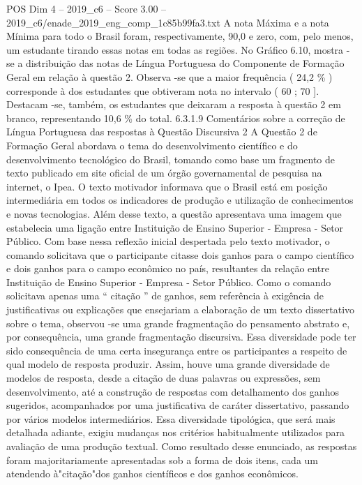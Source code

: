 \begin{textsample}{POS Dim 4 – 2019\_c6 – Score 3.00 – 2019\_c6/enade\_2019\_eng\_comp\_1c85b99fa3.txt}
A nota Máxima e a nota Mínima para todo o Brasil foram, respectivamente, 90,0 e zero, com, pelo menos, um estudante tirando essas notas em todas as regiões.
No Gráfico 6.10, mostra -se a distribuição das notas de Língua Portuguesa do Componente de Formação Geral em relação à questão 2.
Observa -se que a maior frequência ( 24,2 \% ) corresponde à dos estudantes que obtiveram nota no intervalo ( 60 ; 70 ].
Destacam -se, também, os estudantes que deixaram a resposta à questão 2 em branco, representando 10,6 \% do total. 6.3.1.9 Comentários sobre a correção de Língua Portuguesa das respostas à Questão Discursiva 2 A Questão 2 de Formação Geral abordava o tema do desenvolvimento científico e do desenvolvimento tecnológico do Brasil, tomando como base um fragmento de texto publicado em site oficial de um órgão governamental de pesquisa na internet, o Ipea.
O texto motivador informava que o Brasil está em posição intermediária em todos os indicadores de produção e utilização de conhecimentos e novas tecnologias.
Além desse texto, a questão apresentava uma imagem que estabelecia uma ligação entre Instituição de Ensino Superior - Empresa - Setor Público.
Com base nessa reflexão inicial despertada pelo texto motivador, o comando solicitava que o participante citasse dois ganhos para o campo científico e dois ganhos para o campo econômico no país, resultantes da relação entre Instituição de Ensino Superior - Empresa - Setor Público.
Como o comando solicitava apenas uma “ citação ” de ganhos, sem referência à exigência de justificativas ou explicações que ensejariam a elaboração de um texto dissertativo sobre o tema, observou -se uma grande fragmentação do pensamento abstrato e, por consequência, uma grande fragmentação discursiva.
Essa diversidade pode ter sido consequência de uma certa insegurança entre os participantes a respeito de qual modelo de resposta produzir.
Assim, houve uma grande diversidade de modelos de resposta, desde a citação de duas palavras ou expressões, sem desenvolvimento, até a construção de respostas com detalhamento dos ganhos sugeridos, acompanhados por uma justificativa de caráter dissertativo, passando por vários modelos intermediários.
Essa diversidade tipológica, que será mais detalhada adiante, exigiu mudanças nos critérios habitualmente utilizados para avaliação de uma produção textual.
Como resultado desse enunciado, as respostas foram majoritariamente apresentadas sob a forma de dois itens, cada um atendendo à"citação"dos ganhos científicos e dos ganhos econômicos.

\end{textsample}
